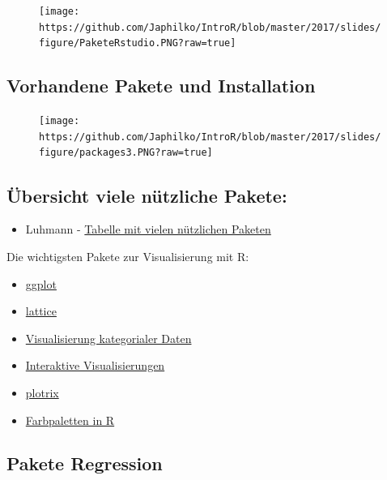 \documentclass[]{article}
\providecommand{\tightlist}{%
  \setlength{\itemsep}{0pt}\setlength{\parskip}{0pt}}
\begin{document}
\begin{figure}[htbp]
\centering
\texttt{[image: https://github.com/Japhilko/IntroR/blob/master/2017/slides/figure/PaketeRstudio.PNG?raw=true]}
\caption{}
\end{figure}

\subsection{Vorhandene Pakete und
Installation}\label{vorhandene-pakete-und-installation}

\begin{figure}[htbp]
\centering
\texttt{[image: https://github.com/Japhilko/IntroR/blob/master/2017/slides/figure/packages3.PNG?raw=true]}
\caption{}
\end{figure}

\subsection{Übersicht viele nützliche
Pakete:}\label{ubersicht-viele-nutzliche-pakete}

\begin{itemize}
\tightlist
\item
  Luhmann -
  \href{http://www.beltz.de/fileadmin/beltz/downloads/OnlinematerialienPVU/28090_Luhmann/Verwendete\%20Pakete.pdf}{Tabelle
  mit vielen nützlichen Paketen}
\end{itemize}

Die wichtigsten Pakete zur Visualisierung mit R:

\begin{itemize}
\tightlist
\item
  \href{http://ggplot2.org/}{ggplot}
\item
  \href{http://lattice.r-forge.r-project.org/Vignettes/src/lattice-intro/lattice-intro.pdf}{lattice}
\item
  \href{http://www.statmethods.net/advgraphs/mosaic.html}{Visualisierung
  kategorialer Daten}
\item
  \href{http://cran.r-project.org/web/packages/googleVis/vignettes/googleVis_examples.html}{Interaktive
  Visualisierungen}
\item
  \href{http://www.inside-r.org/packages/cran/plotrix/docs/draw.circle}{plotrix}
\item
  \href{http://cran.r-project.org/web/packages/colorspace/vignettes/hcl-colors.pdf}{Farbpaletten
  in R}
\end{itemize}

\subsection{Pakete Regression}\label{pakete-regression}
\end{document}
